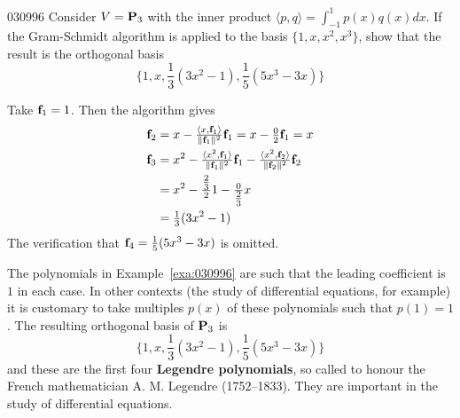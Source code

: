 \begin{example}{}{030996}
Consider $V = \textbf{P}_{3}$ with the inner product $\langle p, q\rangle = \int_{-1}^{1} p(x)q(x)dx$. If the Gram-Schmidt algorithm is
applied to the basis $\{1, x, x^{2}, x^{3}\}$, show that the result is the orthogonal basis
\begin{equation*}
\{1, x, \frac{1}{3}(3x^2 - 1), \frac{1}{5}(5x^3 - 3x) \}
\end{equation*}
\vspace*{-2em}
\begin{solution}
Take $\textbf{f}_{1} = 1$. Then the algorithm gives
\begin{align*}
\textbf{f}_2 &= x - \tfrac{\langle x, \textbf{f}_1 \rangle}{\| \textbf{f}_1 \| ^2} \textbf{f}_1 = x - \tfrac{0}{2} \textbf{f}_1 = x \\
\textbf{f}_3 &= x^ 2 - \tfrac{\langle x^2, \textbf{f}_1 \rangle}{\| \textbf{f}_1 \| ^2} \textbf{f}_1 - \tfrac{\langle x^2, \textbf{f}_2 \rangle}{\| \textbf{f}_2 \| ^2} \textbf{f}_2 \\
&= x^2 - \tfrac{\tfrac{2}{3}}{2}1 - \tfrac{0}{\tfrac{2}{3}}x \\
&= \tfrac{1}{3}(3x^2 - 1)
\end{align*}
The verification that $\textbf{f}_4 = \tfrac{1}{5}(5x^3 - 3x)$ is omitted.
\end{solution}
\end{example}

\noindent The polynomials in Example~\ref{exa:030996} are such that the leading coefficient is $1$ in each case. In other contexts (the study of differential equations, for example) it is customary to take multiples $p(x)$ of these polynomials such that $p(1) = 1$. The resulting orthogonal basis of $\textbf{P}_{3}$ is
\begin{equation*}
\{1, x, \frac{1}{3}(3x^2 - 1), \frac{1}{5}(5x^3 - 3x) \}
\end{equation*}
and these are the first four \textbf{Legendre polynomials}, so called to honour the French mathematician A. M. Legendre (1752--1833). They are important in the study of differential equations.

